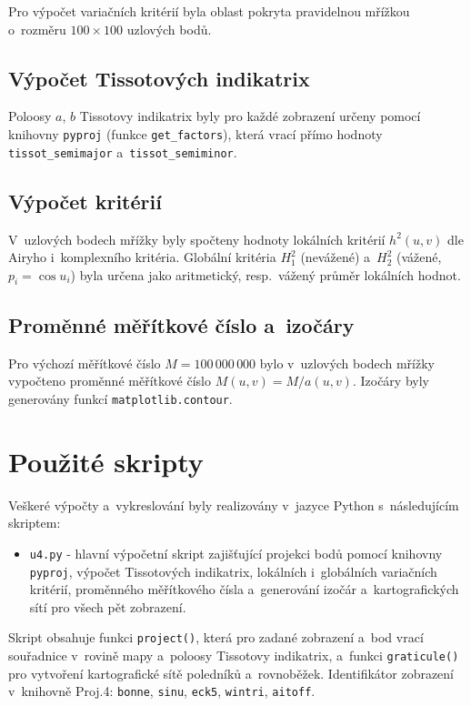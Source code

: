 \documentclass[11pt, a4paper]{article}
\begin{document}
Pro výpočet variačních kritérií byla oblast pokryta pravidelnou mřížkou o~rozměru $100 \times 100$ uzlových bodů.

\subsection{Výpočet Tissotových indikatrix}

Poloosy $a$, $b$ Tissotovy indikatrix byly pro každé zobrazení určeny pomocí knihovny \texttt{pyproj} (funkce \texttt{get\_factors}), která vrací přímo hodnoty \texttt{tissot\_semimajor} a~\texttt{tissot\_semiminor}.

\subsection{Výpočet kritérií}

V~uzlových bodech mřížky byly spočteny hodnoty lokálních kritérií $h^2(u,v)$ dle Airyho i~komplexního kritéria. Globální kritéria $H_1^2$ (nevážené) a~$H_2^2$ (vážené, $p_i = \cos u_i$) byla určena jako aritmetický, resp.\ vážený průměr lokálních hodnot.

\subsection{Proměnné měřítkové číslo a~izočáry}

Pro výchozí měřítkové číslo $M = 100\,000\,000$ bylo v~uzlových bodech mřížky vypočteno proměnné měřítkové číslo $M(u,v) = M / a(u,v)$. Izočáry byly generovány funkcí \texttt{matplotlib.contour}.

\newpage

\section{Použité skripty}

Veškeré výpočty a~vykreslování byly realizovány v~jazyce Python s~následujícím skriptem:

\begin{itemize}
    \item \texttt{u4.py} - hlavní výpočetní skript zajišťující projekci bodů pomocí knihovny \texttt{pyproj}, výpočet Tissotových indikatrix, lokálních i~globálních variačních kritérií, proměnného měřítkového čísla a~generování izočár a~kartografických sítí pro všech pět zobrazení.
\end{itemize}

Skript obsahuje funkci \texttt{project()}, která pro zadané zobrazení a~bod vrací souřadnice v~rovině mapy a~poloosy Tissotovy indikatrix, a~funkci \texttt{graticule()} pro vytvoření kartografické sítě poledníků a~rovnoběžek. Identifikátor zobrazení v~knihovně Proj.4: \texttt{bonne}, \texttt{sinu}, \texttt{eck5}, \texttt{wintri}, \texttt{aitoff}.
\end{document}
